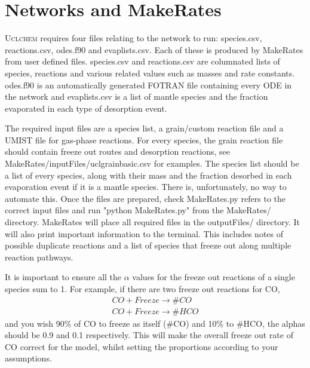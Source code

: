 \documentclass{llncs}
\begin{document}
\section{Networks and MakeRates}
\label{sec:network}
\textsc{Uclchem} requires four files relating to the network to run: species.csv, reactions.csv, odes.f90 and evaplists.csv. Each of these is produced by MakeRates from user defined files. species.csv and reactions.csv are columnated lists of species, reactions and various related values such as masses and rate constants. odes.f90 is an automatically generated FOTRAN file containing every ODE in the network and evaplists.csv is a list of mantle species and the fraction evaporated in each type of desorption event.\par
The required input files are a species list, a grain/custom reaction file and a UMIST file for gas-phase reactions. For every species, the grain reaction file should contain freeze out routes and desorption reactions, see MakeRates/inputFiles/uclgrainbasic.csv for examples. The species list should be a list of every species, along with their mass and the fraction desorbed in each evaporation event if it is a mantle species. There is, unfortunately, no way to automate this. Once the files are prepared, check MakeRates.py refers to the correct input files and run "python MakeRates.py" from the MakeRates/ directory. MakeRates will place all required files in the outputFiles/ directory. It will also print important information to the terminal. This includes notes of possible duplicate reactions and a list of species that freeze out along multiple reaction pathways. \par
It is important to ensure all the $\alpha$ values for the freeze out reactions of a single species sum to 1. For example, if there are two freeze out reactions for CO,
\begin{eqnarray}
CO + Freeze \rightarrow \#CO \\
CO + Freeze \rightarrow \#HCO
\end{eqnarray}
 and you wish 90\% of CO to freeze as itself (\#CO) and 10\% to \#HCO, the alphas should be 0.9 and 0.1 respectively. This will make the overall freeze out rate of CO correct for the model, whilst setting the proportions according to your assumptions.     
%
%
\end{document}
